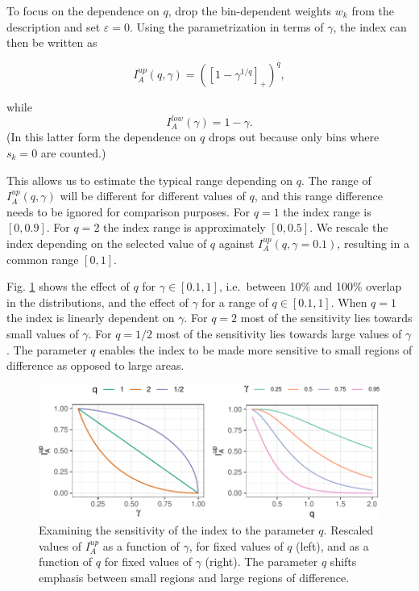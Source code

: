 \documentclass[]{interact}
\theoremstyle{plain}%
\theoremstyle{definition}
\theoremstyle{remark}
\begin{document}
To focus on the dependence on \(q\), drop the bin-dependent weights
\(w_k\) from the description and set \(\varepsilon=0\). Using the
parametrization in terms of \(\gamma\), the index can then be written as

\begin{equation}
I_A^{up}(q, \gamma) = ([1-\gamma^{1/q}]_+)^q,
\label{eq:p1}
\end{equation}

\noindent while \begin{equation}
I_A^{low}(\gamma) = 1-\gamma.
\end{equation} (In this latter form the dependence on \(q\) drops out
because only bins where \(s_k=0\) are counted.)

This allows us to estimate the typical range depending on \(q\). The
range of \(I_A^{up}(q, \gamma)\) will be different for different values
of \(q\), and this range difference needs to be ignored for comparison
purposes. For \(q=1\) the index range is \([0,0.9]\). For \(q=2\) the
index range is approximately \([0, 0.5]\). We rescale the index
depending on the selected value of \(q\) against
\(I_A^{up}(q, \gamma=0.1)\), resulting in a common range \([0,1]\).

Fig. \ref{fig:behavior} shows the effect of \(q\) for
\(\gamma \in [0.1, 1]\), i.e.~between 10\% and 100\% overlap in the
distributions, and the effect of \(\gamma\) for a range of
\(q \in [0.1, 1]\). When \(q=1\) the index is linearly dependent on
\(\gamma\). For \(q=2\) most of the sensitivity lies towards small
values of \(\gamma\). For \(q=1/2\) most of the sensitivity lies towards
large values of \(\gamma\). The parameter \(q\) enables the index to be
made more sensitive to small regions of difference as opposed to large
areas.

\begin{figure}

{\centering \includegraphics[width=1\linewidth]{section_pursuit_files/figure-latex/behavior-1} 

}

\caption{Examining the sensitivity of the index to the parameter $q$. Rescaled values of $I_A^{up}$ as a function of $\gamma$, for fixed values of $q$ (left), and as a function of $q$ for fixed values of $\gamma$ (right). The parameter $q$ shifts emphasis between small regions and large regions of difference.}\label{fig:behavior}
\end{figure}
\end{document}
